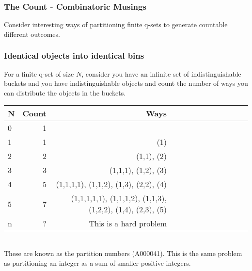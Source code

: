 \documentclass[a4paper]{scrartcl}
\begin{document}
\subsubsection{The Count - Combinatoric Musings}
Consider interesting ways of partitioning finite q-sets to generate countable different outcomes.
\subsubsection{Identical objects into identical bins}
For a finite q-set of size $N$, consider you have an infinite set of indistinguishable buckets and you have indistinguishable objects and count the number of ways you can distribute the objects in the buckets.\\
\begin{tabular}
{| l | r | r | r | r | c | c | c | c | c | c | c | c | } \hline
N & Count & Ways \\ \hline
0 & 1 & \\ \hline
1 & 1 & (1) \\ \hline
2 & 2 & (1,1), (2) \\ \hline
3 & 3 & (1,1,1), (1,2), (3) \\ \hline
4 & 5 & (1,1,1,1), (1,1,2), (1,3), (2,2), (4)\\ \hline
5 & 7 & (1,1,1,1,1), (1,1,1,2), (1,1,3), (1,2,2), (1,4), (2,3), (5) \\ \hline
n & ? & This is a hard problem \\ \hline
\end{tabular} \\
These are known as the partition numbers (A000041). This is the same problem as partitioning an integer as a sum of smaller positive integers.\\
\end{document}
